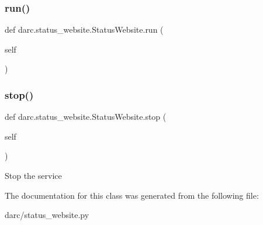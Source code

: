 \subsubsection{\texorpdfstring{run()}{run()}}
{\footnotesize\ttfamily def darc.\+status\+\_\+website.\+Status\+Website.\+run (\begin{DoxyParamCaption}\item[{}]{self }\end{DoxyParamCaption})}

\begin{DoxyVerb}\end{DoxyVerb}
 \mbox{\label{classdarc_1_1status__website_1_1_status_website_a7d75733750c05bf3dfda95339be82f85}} 
\subsubsection{\texorpdfstring{stop()}{stop()}}
{\footnotesize\ttfamily def darc.\+status\+\_\+website.\+Status\+Website.\+stop (\begin{DoxyParamCaption}\item[{}]{self }\end{DoxyParamCaption})}

\begin{DoxyVerb}Stop the service
\end{DoxyVerb}
 

The documentation for this class was generated from the following file\+:\begin{DoxyCompactItemize}
\item 
darc/status\+\_\+website.\+py\end{DoxyCompactItemize}
